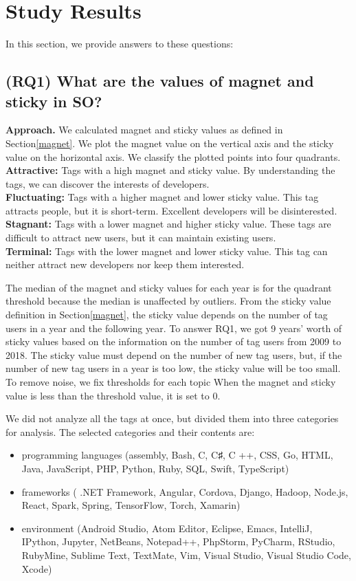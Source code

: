 \documentclass[english,preprint,JIP,technote]{ipsj}
\begin{document}
\section{Study Results} %
In this section, we provide answers to these questions:
\subsection{(RQ1) What are the values of magnet and sticky in SO?}

\noindent
\textbf{Approach.}
We calculated magnet and sticky values as defined in Section\ref{magnet}. We plot the magnet value on the vertical axis and the sticky value on the horizontal axis. We classify the plotted points into four quadrants.\\
\textbf
{Attractive:} Tags with a high magnet and sticky value. By understanding the tags, we can discover the interests of developers.\\
\textbf{Fluctuating:} Tags with a higher magnet and lower sticky value. This tag attracts people, but it is short-term. Excellent developers will be disinterested.\\
\textbf{Stagnant:} Tags with a lower magnet and higher sticky value. These tags are difficult to attract new users, but it can maintain existing users.\\
\textbf{Terminal:} Tags with the lower magnet and lower sticky value. This tag can neither attract new developers nor keep them interested.

The median of the magnet and sticky values for each year is for the quadrant threshold because the median is unaffected by outliers. From the sticky value definition in Section\ref{magnet}, the sticky value depends on the number of tag users in a year and the following year. To answer RQ1, we got 9 years’ worth of sticky values based on the information on the number of tag users from 2009 to 2018. The sticky value must depend on the number of new tag users, but, if the number of new tag users in a year is too low, the sticky value will be too small. To remove noise, we fix thresholds for each topic When the magnet and sticky value is less than the threshold value, it is set to 0.


We did not analyze all the tags at once, but divided them into three categories for analysis. The selected categories and their contents are:
\begin{itemize}
\item programming languages ​​(assembly, Bash, C, C♯, C ++, CSS, Go, HTML, Java, JavaScript, PHP, Python, Ruby, SQL, Swift, TypeScript)
\item frameworks ( .NET Framework, Angular, Cordova, Django, Hadoop, Node.js, React, Spark, Spring, TensorFlow, Torch, Xamarin)
\item environment (Android Studio, Atom Editor, Eclipse, Emacs, IntelliJ, IPython, Jupyter, NetBeans, Notepad++, PhpStorm, PyCharm, RStudio, RubyMine, Sublime Text, TextMate, Vim, Visual Studio, Visual Studio Code, Xcode)
\end{itemize}
\end{document}
